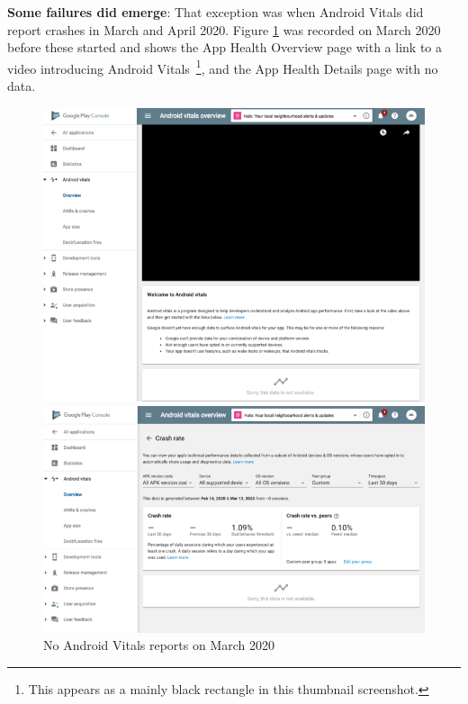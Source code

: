 \textbf{Some failures did emerge}:
That exception was when Android Vitals did report crashes in March and April 2020. Figure \ref{fig:localhalo-android-vitals-no-data-16-march-2020} was recorded on  March 2020 before these started and shows the App Health Overview page with a link to a video introducing Android Vitals~\footnote{This appears as a mainly black rectangle in this thumbnail screenshot.}, and the App Health Details page with no data.

\begin{figure}[htbp!]
\centering
\begin{minipage}{.45\textwidth}
  \centering
  \includegraphics[width=\textwidth]{images/localhalo/apphealthoverviewplace_5550596_no_data.png}
\end{minipage}\hfill%
\begin{minipage}{.45\textwidth}
  \centering
  \includegraphics[width=\textwidth]{images/localhalo/apphealthdetailsplace_55505963_no_data.png}
\end{minipage}
    \caption{No Android Vitals reports on  March 2020}
    \label{fig:localhalo-android-vitals-no-data-16-march-2020}
\end{figure}

